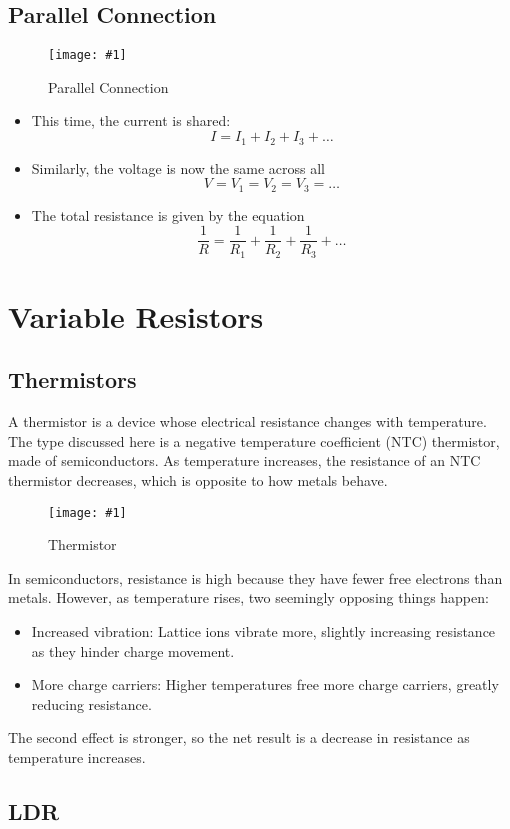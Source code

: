 \documentclass[a4paper,12pt]{article}
\let\oldsection\section
\renewcommand\section{\clearpage\oldsection}
\newcommand{\lb}{\\[8pt]}
\newcommand{\img}[4]{\begin{center}
  \begin{figure}[H]
    \centering
    \texttt{[image: \#1]}
    \caption{#3}
    \label{fig:#4}
  \end{figure}
\end{center}}
\begin{document}
\pagebreak

\subsection{Parallel Connection}
\img{parallel.png}{0.7}{Parallel Connection}{parallel}
\begin{itemize}
  \item This time, the current is shared:
        $$I = I_1 + I_2 + I_3 + \ldots$$
  \item Similarly, the voltage is now the same across all
        $$V = V_1 = V_2 = V_3 = \ldots$$
  \item The total resistance is given by the equation
        $$\frac{1}{R} = \frac{1}{R_1} + \frac{1}{R_2} + \frac{1}{R_3} + \ldots$$
\end{itemize}

\section{Variable Resistors}

\subsection{Thermistors}

A thermistor is a device whose electrical resistance changes with temperature.\lb
The type discussed here is a negative temperature coefficient (NTC) thermistor, made of semiconductors. As temperature increases, the resistance of an NTC thermistor decreases, which is opposite to how metals behave.
\img{thermistor.png}{0.7}{Thermistor}{thermistor}

In semiconductors, resistance is high because they have fewer free electrons than metals. However, as temperature rises, two seemingly opposing things happen:

\begin{itemize}
  \item Increased vibration: Lattice ions vibrate more, slightly increasing resistance as they hinder charge movement.
  \item More charge carriers: Higher temperatures free more charge carriers, greatly reducing resistance.
\end{itemize}

The second effect is stronger, so the net result is a decrease in resistance as temperature increases.

\subsection{LDR}
\end{document}
